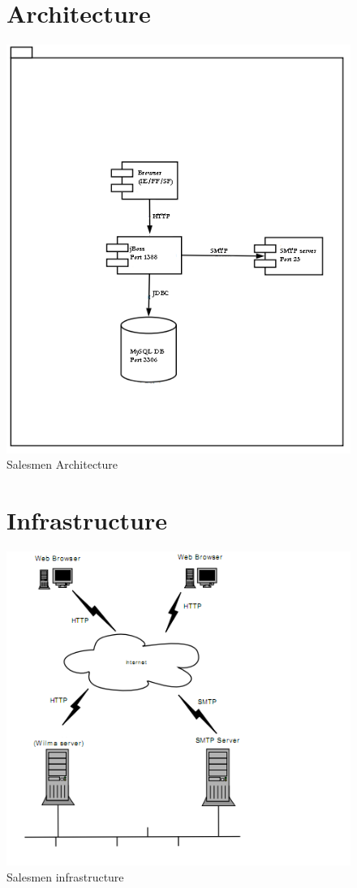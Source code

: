 \documentclass[a4paper, 12pt]{report}
\begin{document}
\begin{figure}
\section{Architecture}
\label{fig_architecture}
\includegraphics[scale=0.8]{../../img/archi1.png}
\caption{Salesmen Architecture}
\end{figure}

\begin{figure}
\section{Infrastructure}
\label{fig_infrastructure}
\includegraphics[scale=0.8]{../../img/infra1.png}
\caption{Salesmen infrastructure}
\end{figure}
\end{document}
